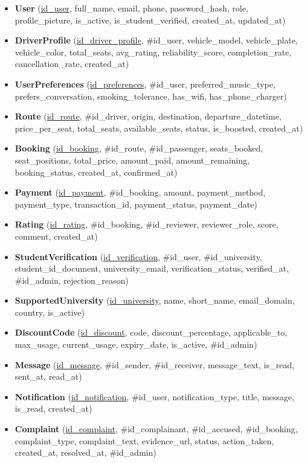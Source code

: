 \begin{itemize}[noitemsep]
    \item \textbf{User} (\underline{id\_user}, full\_name, email, phone, password\_hash, role, profile\_picture, is\_active, is\_student\_verified, created\_at, updated\_at)
    \item \textbf{DriverProfile} (\underline{id\_driver\_profile}, \#id\_user, vehicle\_model, vehicle\_plate, vehicle\_color, total\_seats, avg\_rating, reliability\_score, completion\_rate, cancellation\_rate, created\_at)
    \item \textbf{UserPreferences} (\underline{id\_preferences}, \#id\_user, preferred\_music\_type, prefers\_conversation, smoking\_tolerance, has\_wifi, has\_phone\_charger)
    \item \textbf{Route} (\underline{id\_route}, \#id\_driver, origin, destination, departure\_datetime, price\_per\_seat, total\_seats, available\_seats, status, is\_boosted, created\_at)
    \item \textbf{Booking} (\underline{id\_booking}, \#id\_route, \#id\_passenger, seats\_booked, seat\_positions, total\_price, amount\_paid, amount\_remaining, booking\_status, created\_at, confirmed\_at)
    \item \textbf{Payment} (\underline{id\_payment}, \#id\_booking, amount, payment\_method, payment\_type, transaction\_id, payment\_status, payment\_date)
    \item \textbf{Rating} (\underline{id\_rating}, \#id\_booking, \#id\_reviewer, reviewer\_role, score, comment, created\_at)
    \item \textbf{StudentVerification} (\underline{id\_verification}, \#id\_user, \#id\_university, student\_id\_document, university\_email, verification\_status, verified\_at, \#id\_admin, rejection\_reason)
    \item \textbf{SupportedUniversity} (\underline{id\_university}, name, short\_name, email\_domain, country, is\_active)
    \item \textbf{DiscountCode} (\underline{id\_discount}, code, discount\_percentage, applicable\_to, max\_usage, current\_usage, expiry\_date, is\_active, \#id\_admin)
    \item \textbf{Message} (\underline{id\_message}, \#id\_sender, \#id\_receiver, message\_text, is\_read, sent\_at, read\_at)
    \item \textbf{Notification} (\underline{id\_notification}, \#id\_user, notification\_type, title, message, is\_read, created\_at)
    \item \textbf{Complaint} (\underline{id\_complaint}, \#id\_complainant, \#id\_accused, \#id\_booking, complaint\_type, complaint\_text, evidence\_url, status, action\_taken, created\_at, resolved\_at, \#id\_admin)
\end{itemize}

